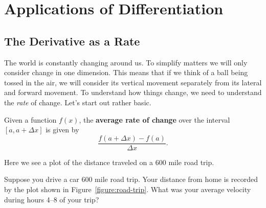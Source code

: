 \chapter{Applications of Differentiation}

\section{The Derivative as a Rate}

The world is constantly changing around us. To simplify matters we
will only consider change in one dimension. This means that if we
think of a ball being tossed in the air, we will consider its vertical
movement separately from its lateral and forward movement.  To
understand how things change, we need to understand the \textit{rate}
of change. Let's start out rather basic.

\begin{definition}
Given a function $f(x)$, the \textbf{average rate of change} over the
interval $[a, a+\Delta x]$ is given by
\[
\frac{f(a+\Delta x) - f(a)}{\Delta x}.
\]
\end{definition}
\begin{marginfigure}
\caption{Here we see a plot of the distance traveled on a 600 mile road trip.}
\label{figure:road-trip}
\end{marginfigure}

\begin{example}
Suppose you drive a car 600 mile road trip. Your distance from home is
recorded by the plot shown in Figure~\ref{figure:road-trip}. What was
your average velocity during hours 4--8 of your trip?
\end{example}

